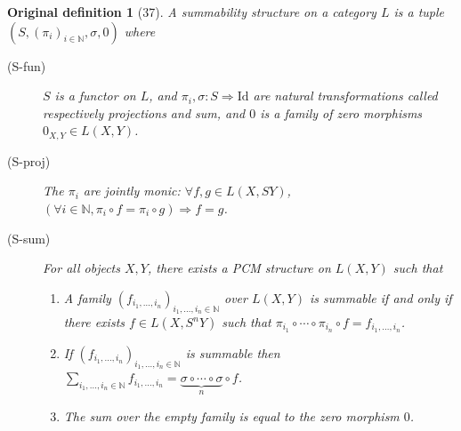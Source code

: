 \documentclass[10pt,a4paper]{article}
\newtheorem*{originaldef}{Original definition}
\begin{document}
\begin{originaldef}[37] A summability structure on a category $L$ is a tuple $(S,(\pi_i)_{i\in\mathbb N},\sigma,0)$ where
\begin{description}
\item[(S-fun)] $S$ is a functor on $L$, and $\pi_i,\sigma:S\Rightarrow\mathrm{Id}$ are natural transformations called respectively projections and sum, and $0$ is a family of zero morphisms $0_{X,Y}\in L(X,Y)$.
\item[(S-proj)] The $\pi_i$ are jointly monic: $\forall f,g\in L(X,SY)$, $(\forall i\in\mathbb N,\pi_i\circ f=\pi_i\circ g)\Rightarrow f=g$.
\item[(S-sum)] For all objects $X,Y$, there exists a PCM structure on $L(X,Y)$ such that
\begin{enumerate}\item[(S-sum-1)] A family $(f_{i_1,\ldots,i_n})_{i_1,\ldots,i_n\in\mathbb N}$ over $L(X,Y)$ is summable if and only if there exists $f\in L(X,S^nY)$ such that $\pi_{i_1}\circ\cdots\circ\pi_{i_n}\circ f=f_{i_1,\ldots,i_n}$.
\item[(S-sum-2)] If $(f_{i_1,\ldots,i_n})_{i_1,\ldots,i_n\in\mathbb N}$ is summable then $\sum_{i_1,\ldots,i_n\in\mathbb N}f_{i_1,\ldots,i_n}=\underbrace{\sigma\circ\cdots\circ\sigma}_{n}\circ f$.
\item[(S-sum-3)] The sum over the empty family is equal to the zero morphism $0$.
\end{enumerate}\end{description}\end{originaldef}

\end{document}
